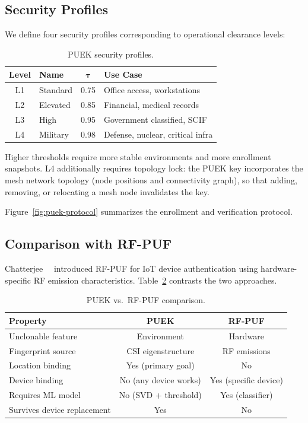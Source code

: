 \subsection{Security Profiles}
\label{subsec:security-profiles}

We define four security profiles corresponding to operational clearance levels:

\begin{table}[t]
\centering
\caption{PUEK security profiles.}
\label{tab:puek-profiles}
\small
\begin{tabular}{@{}clcl@{}}
\toprule
\textbf{Level} & \textbf{Name} & $\boldsymbol{\tau}$ & \textbf{Use Case} \\
\midrule
L1 & Standard  & 0.75 & Office access, workstations \\
L2 & Elevated  & 0.85 & Financial, medical records \\
L3 & High      & 0.95 & Government classified, SCIF \\
L4 & Military  & 0.98 & Defense, nuclear, critical infra \\
\bottomrule
\end{tabular}
\end{table}

Higher thresholds require more stable environments and more enrollment snapshots.
L4 additionally requires topology lock: the PUEK key incorporates the mesh network topology (node positions and connectivity graph), so that adding, removing, or relocating a mesh node invalidates the key.

Figure~\ref{fig:puek-protocol} summarizes the enrollment and verification protocol.



\subsection{Comparison with RF-PUF}
\label{subsec:rfpuf-comparison}

Chatterjee~\etal~\cite{chatterjee2019rfpuf} introduced RF-PUF for IoT device authentication using hardware-specific RF emission characteristics.
Table~\ref{tab:puek-vs-rfpuf} contrasts the two approaches.

\begin{table}[t]
\centering
\caption{PUEK vs.\ RF-PUF comparison.}
\label{tab:puek-vs-rfpuf}
\small
\begin{tabular}{@{}lcc@{}}
\toprule
\textbf{Property} & \textbf{PUEK} & \textbf{RF-PUF} \\
\midrule
Unclonable feature & Environment & Hardware \\
Fingerprint source & CSI eigenstructure & RF emissions \\
Location binding & Yes (primary goal) & No \\
Device binding & No (any device works) & Yes (specific device) \\
Requires ML model & No (SVD + threshold) & Yes (classifier) \\
Survives device replacement & Yes & No \\
\bottomrule
\end{tabular}
\end{table}

